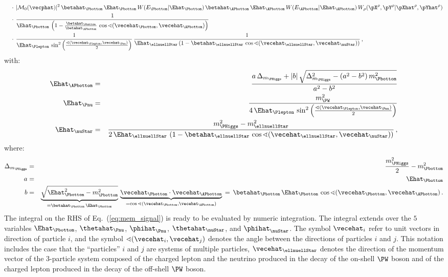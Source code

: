 \begin{align}
 & \quad \cdot \, \vert \mathcal{M}_{0}(\vecphat) \vert^{2} \, 
\betahat_{\Pbottom} \, \Ehat_{\Pbottom} \, W(E_{\Pbottom}|\Ehat_{\Pbottom}) \, 
\betahat_{\APbottom} \, \Ehat_{\APbottom} \, W(E_{\APbottom}|\Ehat_{\APbottom}) \,
W_{\rho}( \pX^{\rho},\pY^{\rho} | \pXhat^{\rho},\pYhat^{\rho} ) \nonumber \\
 & \quad \cdot \, \frac{1}{\Ehat_{\Pbottom} \, \left( 1 - \frac{\betahat_{\Pbottom}}{\betahat_{\APbottom}} \, \cos\sphericalangle(\vecehat_{\Pbottom},\vecehat_{\APbottom}) \right)} \nonumber \\
 & \quad \cdot \, \frac{1}{\Ehat_{\Plepton} \, \sin^{2}\left(\frac{\sphericalangle(\vecehat_{\Plepton},\vecehat_{\Pnu})}{2}\right)} \,
\frac{1}{\Ehat_{\ellnuellStar} \left( 1 - \betahat_{\ellnuellStar} \, \cos\sphericalangle(\vecehat_{\ellnuellStar},\vecehat_{\nuStar}) \right)} \, ,
\label{eq:mem_signal}
\end{align}
with:
\begin{eqnarray}
\Ehat_{\APbottom} & = & \frac{a \, \Delta_{m_{\PHiggs}} + |b| \, \sqrt{\Delta_{m_{\PHiggs}}^{2} - (a^{2} - b^{2}) \, m_{\Pbottom}^{2}}}{a^{2} - b^{2}} \nonumber \\
\Ehat_{\Pnu} & = & \frac{m_{\PW}^{2}}{4 \, \Ehat_{\Plepton} \, \sin^{2}\left(\frac{\sphericalangle(\vecehat_{\Plepton},\vecehat_{\Pnu})}{2}\right)} \nonumber \\
\Ehat_{\nuStar} & = & \frac{m_{\PHiggs}^{2} - m_{\ellnuellStar}^{2}}{2 \, \Ehat_{\ellnuellStar} \, 
 \left( 1 - \betahat_{\ellnuellStar} \, \cos\sphericalangle(\vecehat_{\ellnuellStar},\vecehat_{\nuStar}) \right)} \, ,
\end{eqnarray}
where:
\begin{eqnarray}
\Delta_{m_{\PHiggs}} & = & \frac{m_{\PHiggs}^{2}}{2} - m_{\Pbottom}^{2} \nonumber \\
a & = & \Ehat_{\Pbottom} \nonumber \\
b & = & \underbrace{\sqrt{\Ehat_{\Pbottom}^{2} - m_{\Pbottom}^{2}}}_{= \betahat_{\Pbottom} \, \Ehat_{\Pbottom}} \, 
 \underbrace{\vecehat_{\Pbottom} \cdot \vecehat_{\APbottom}}_{= \cos\sphericalangle(\vecehat_{\Pbottom},\vecehat_{\APbottom})} \, 
= \, \betahat_{\Pbottom} \, \Ehat_{\Pbottom} \, \cos\sphericalangle(\vecehat_{\Pbottom},\vecehat_{\APbottom}) \, .
\end{eqnarray}
The integral on the RHS of Eq.~(\ref{eq:mem_signal}) is ready to be evaluated by numeric integration. 
The integral extends over the $5$ variables
 $\Ehat_{\Pbottom}$, $\thetahat_{\Pnu}$, $\phihat_{\Pnu}$, $\thetahat_{\nuStar}$, and $\phihat_{\nuStar}$.
The symbol $\vecehat_{i}$ refer to unit vectors in direction of particle $i$,
and the symbol $\sphericalangle(\vecehat_{i},\vecehat_{j})$ denotes the angle between the directions of particles $i$ and $j$.
This notation includes the case that the ``particles'' $i$ and $j$ are systems of multiple particles,
\eg $\vecehat_{\ellnuellStar}$ denotes the direction of the momentum vector of the $3$-particle system composed of
the charged lepton and the neutrino produced in the decay of the on-shell $\PW$ boson and of the charged lepton produced in the decay of the off-shell $\PW$ boson.

